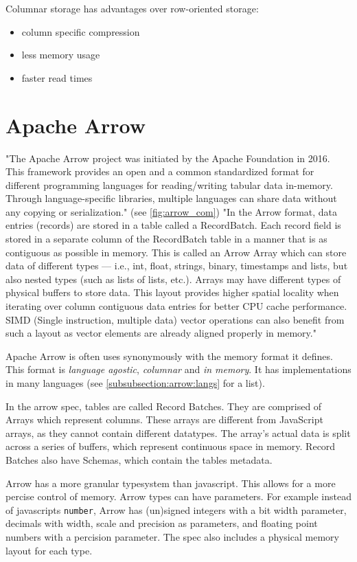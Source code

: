 Columnar storage has advantages over row-oriented storage:
\begin{itemize}
	\item column specific compression \autocite{Abadi2013}
	\item less memory usage \autocite{Abadi2013}
	\item faster read times \autocite{Floratou2019}
\end{itemize}


\section{Apache Arrow}
\label{section:arrow}
"The Apache Arrow project was initiated by the Apache Foundation in 2016.
This framework provides an open and a common standardized format for different programming languages for reading/writing tabular data in-memory.
Through language-specific libraries, multiple languages can share data without any copying or serialization." \autocite{Ahmad2020} (see \ref{fig:arrow_com})
"In the Arrow format, data entries (records) are stored in a table called a RecordBatch.
Each record field is stored in a separate column of the RecordBatch table in a manner that is as contiguous as possible in memory.
This is called an Arrow Array which can store data of different types — i.e., int, float, strings, binary, timestamps and lists, but also nested types (such as lists of lists, etc.).
Arrays may have different types of physical buffers to store data.
This layout provides higher spatial locality when iterating over column contiguous data entries for better CPU cache performance.
SIMD (Single instruction, multiple data) vector operations can also benefit from such a layout as vector elements are already aligned properly in memory." \autocite{Ahmad2020}

Apache Arrow is often uses synonymously with the memory format it defines.
This format is \emph{language agostic}, \emph{columnar} and \emph{in memory}.
It has implementations in many languages (see \ref{subsubsection:arrow:langs} for a list).

In the arrow spec, tables are called Record Batches. They are comprised of Arrays which represent columns.
These arrays are different from JavaScript arrays, as they cannot contain different datatypes.
The array's actual data is split across a series of buffers, which represent continuous space in memory.
Record Batches also have Schemas, which contain the tables metadata.

Arrow has a more granular typesystem than javascript. This allows for a more percise control of memory.
Arrow types can have parameters.
For example instead of javascripts \Verb|number|, Arrow has (un)signed integers with a bit width parameter,
decimals with width, scale and precision as parameters, and floating point numbers with a percision parameter.
The spec also includes a physical memory layout for each type.

